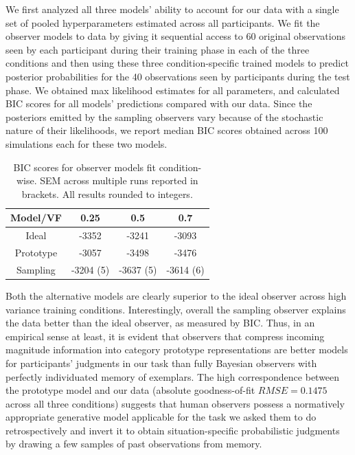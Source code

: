 \documentclass[10pt,letterpaper]{article}
\begin{document}
We first analyzed all three models' ability to account for our data with a single set of pooled hyperparameters estimated across all participants. We fit the observer models to data by giving it sequential access to 60 original observations seen by each participant during their training phase in each of the three conditions and then using these three condition-specific trained models to predict posterior probabilities for the 40 observations seen by participants during the test phase. We obtained max likelihood estimates for all parameters, and calculated BIC scores for all models' predictions compared with our data. Since the posteriors emitted by the sampling observers vary because of the stochastic nature of their likelihoods, we report median BIC scores obtained across 100 simulations each for these two models. 

\begin{table}[]
    \centering
    \begin{tabular}{|c|c|c|c|}
    \hline
         Model/VF & 0.25 & 0.5 & 0.7 \\
         \hline
         Ideal & -3352 & -3241 & -3093 \\
         Prototype & -3057 & -3498 & -3476 \\
         Sampling & -3204 (5) & -3637 (5) & -3614 (6) \\
         \hline 
    \end{tabular}
    \caption{BIC scores for observer models fit condition-wise. SEM across multiple runs reported in brackets. All results rounded to integers.}
    \label{tab:bic}
\end{table}

Both the alternative models are clearly superior to the ideal observer across high variance training conditions. Interestingly, overall the sampling observer explains the data better than the ideal observer, as measured by BIC. Thus, in an empirical sense at least, it is evident that observers that compress incoming magnitude information into category prototype representations are better models for participants' judgments in our task than fully Bayesian observers with perfectly individuated memory of exemplars. The high correspondence between the prototype model and our data (absolute goodness-of-fit $RMSE=0.1475$ across all three conditions) suggests that human observers possess a normatively appropriate generative model applicable for the task we asked them to do retrospectively and invert it to obtain situation-specific probabilistic judgments by drawing a few samples of past observations from memory.  
\end{document}
